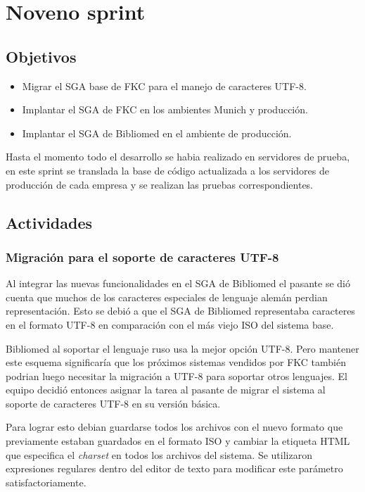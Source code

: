 \section{Noveno sprint} %
\label{sec:noveno_sprint}

\subsection{Objetivos}

\begin{itemize}
	\item Migrar el SGA base de FKC para el manejo de caracteres UTF-8.
	\item Implantar el SGA de FKC en los ambientes Munich y producción.
	\item Implantar el SGA de Bibliomed en el ambiente de producción.
\end{itemize}

Hasta el momento todo el desarrollo se habia realizado en servidores de prueba, en este sprint se translada la base de código actualizada a los servidores de producción de cada empresa y se realizan las pruebas correspondientes.

\subsection{Actividades} %
\label{sub:actividades9}

\subsubsection{Migración para el soporte de caracteres UTF-8}

Al integrar las nuevas funcionalidades en el SGA de Bibliomed el pasante se dió cuenta que muchos de los caracteres especiales de lenguaje alemán perdian representación. Esto se debió a que el SGA de Bibliomed representaba caracteres en el formato UTF-8 en comparación con el más viejo ISO del sistema base.

Bibliomed al soportar el lenguaje ruso usa la mejor opción UTF-8. Pero mantener este esquema significaría que los próximos sistemas vendidos por FKC también podrian luego necesitar la migración a UTF-8 para soportar otros lenguajes. El equipo decidió entonces asignar la tarea al pasante de migrar el sistema al soporte de caracteres UTF-8 en su versión básica.

Para lograr esto debian guardarse todos los archivos con el nuevo formato que previamente estaban guardados en el formato ISO y cambiar la etiqueta HTML que especifica el \emph{charset} en todos los archivos del sistema. Se utilizaron expresiones regulares dentro del editor de texto para modificar este parámetro satisfactoriamente.

